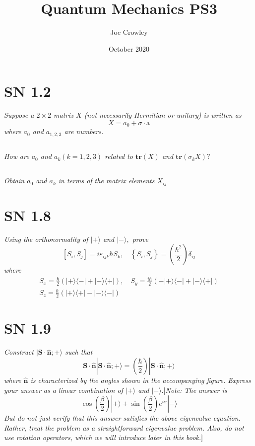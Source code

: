 \documentclass{article}
\title{Quantum Mechanics PS3}
\author{Joe Crowley}
\date{October 2020}
\begin{document}
  

\section{SN 1.2}
\textit{Suppose a $2 \times 2$ matrix $X$ (not necessarily Hermitian or unitary) is written as
$$
X=a_{0}+\sigma \cdot \mathrm{a}
$$
where $a_{0}$ and $a_{1,2,3}$ are numbers.}
\subsection{}
\textit{How are $a_{0}$ and $a_{k}(k=1,2,3)$ related to $\mathbf{tr}(X)$ and $\mathbf{tr}\left(\sigma_{k} X\right) ?$}
\subsection{}
\textit{Obtain $a_{0}$ and $a_{k}$ in terms of the matrix elements $X_{i j}$}

\newpage

\section{SN 1.8}
\textit{Using the orthonormality of $|+\rangle$ and $|-\rangle,$ prove
$$
\left[S_{i}, S_{j}\right]=i \varepsilon_{i j k} \hbar S_{k}, \quad\left\{S_{i}, S_{j}\right\}=\left(\frac{\hbar^{2}}{2}\right) \delta_{i j}
$$
where
$$
\begin{array}{l}
S_{x}=\frac{\hbar}{2}(|+\rangle\langle-|+|-\rangle\langle+|), \quad S_{y}=\frac{i \hbar}{2}(-|+\rangle\langle-|+|-\rangle\langle+|) \\
S_{z}=\frac{\hbar}{2}(|+\rangle\langle+|-|-\rangle\langle-|)
\end{array}
$$}


\newpage

\section{SN 1.9}
\textit{Construct $|\mathbf{S} \cdot \hat{\mathbf{n}} ;+\rangle$ such that
$$
\mathbf{S} \cdot \hat{\mathbf{n}}|\mathbf{S} \cdot \hat{\mathbf{n}} ;+\rangle=\left(\frac{\hbar}{2}\right)|\mathbf{S} \cdot \hat{\mathbf{n}} ;+\rangle
$$
where $\hat{\mathbf{n}}$ is characterized by the angles shown in the accompanying figure. Express your answer as a linear combination of $|+\rangle$ and $|-\rangle .[$Note: The answer is
$$
\cos \left(\frac{\beta}{2}\right)|+\rangle+\sin \left(\frac{\beta}{2}\right) e^{i \alpha}|-\rangle
$$
But do not just verify that this answer satisfies the above eigenvalue equation. Rather, treat the problem as a straightforward eigenvalue problem. Also, do not use rotation operators, which we will introduce later in this book.$]$}
\end{document}
